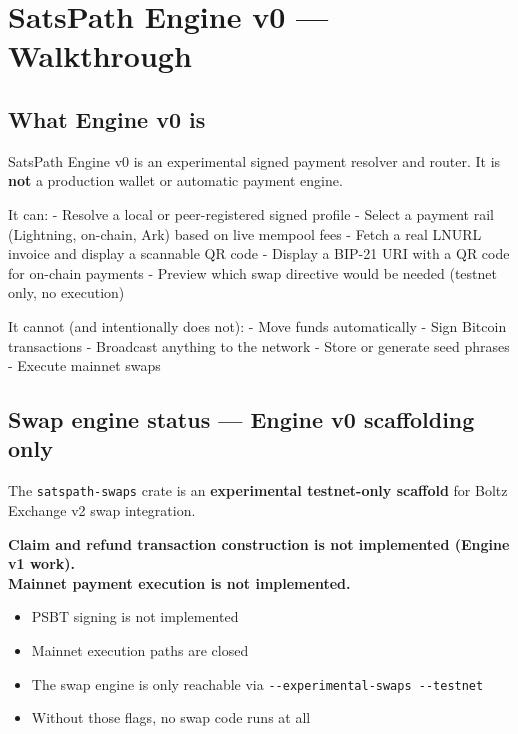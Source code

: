 \documentclass[
]{article}
\author{}
\date{}
\providecommand{\tightlist}{%
  \setlength{\itemsep}{0pt}\setlength{\parskip}{0pt}}
\begin{document}
\hypertarget{satspath-engine-v0-walkthrough}{%
\section{SatsPath Engine v0 ---
Walkthrough}\label{satspath-engine-v0-walkthrough}}

\hypertarget{what-engine-v0-is}{%
\subsection{What Engine v0 is}\label{what-engine-v0-is}}

SatsPath Engine v0 is an experimental signed payment resolver and
router. It is \textbf{not} a production wallet or automatic payment
engine.

It can: - Resolve a local or peer-registered signed profile - Select a
payment rail (Lightning, on-chain, Ark) based on live mempool fees -
Fetch a real LNURL invoice and display a scannable QR code - Display a
BIP-21 URI with a QR code for on-chain payments - Preview which swap
directive would be needed (testnet only, no execution)

It cannot (and intentionally does not): - Move funds automatically -
Sign Bitcoin transactions - Broadcast anything to the network - Store or
generate seed phrases - Execute mainnet swaps

\hypertarget{swap-engine-status-engine-v0-scaffolding-only}{%
\subsection{Swap engine status --- Engine v0 scaffolding
only}\label{swap-engine-status-engine-v0-scaffolding-only}}

The \texttt{satspath-swaps} crate is an \textbf{experimental
testnet-only scaffold} for Boltz Exchange v2 swap integration.

\textbf{Claim and refund transaction construction is not implemented
(Engine v1 work).}\\
\textbf{Mainnet payment execution is not implemented.}

\begin{itemize}
\tightlist
\item
  PSBT signing is not implemented
\item
  Mainnet execution paths are closed
\item
  The swap engine is only reachable via
  \texttt{-\/-experimental-swaps\ -\/-testnet}
\item
  Without those flags, no swap code runs at all
\end{itemize}
\end{document}
